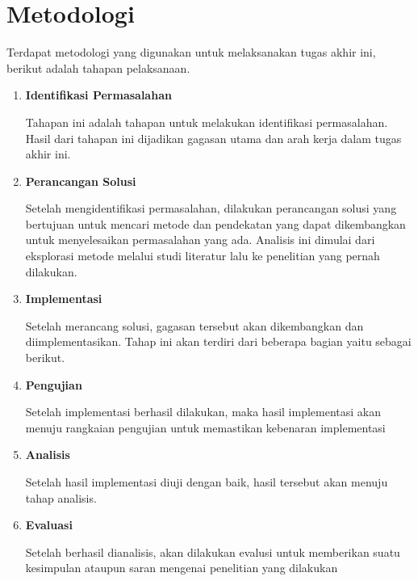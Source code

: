 \section{Metodologi}

Terdapat metodologi yang digunakan untuk melaksanakan tugas akhir ini, berikut adalah tahapan pelaksanaan.
\begin{enumerate}
    \item \textbf{Identifikasi Permasalahan}
    
    Tahapan ini adalah tahapan untuk melakukan identifikasi permasalahan. Hasil dari tahapan ini dijadikan gagasan utama dan arah kerja dalam tugas akhir ini.

    \item \textbf{Perancangan Solusi}
    
    Setelah mengidentifikasi permasalahan, dilakukan perancangan solusi yang bertujuan untuk mencari metode dan pendekatan yang dapat dikembangkan untuk menyelesaikan permasalahan yang ada. Analisis ini dimulai dari eksplorasi metode melalui studi literatur lalu ke penelitian yang pernah dilakukan.

    \item \textbf{Implementasi}
    
    Setelah merancang solusi, gagasan tersebut akan dikembangkan dan diimplementasikan. Tahap ini akan terdiri dari beberapa bagian yaitu sebagai berikut.

    \item \textbf{Pengujian}
    
    Setelah implementasi berhasil dilakukan, maka hasil implementasi akan menuju rangkaian pengujian untuk memastikan kebenaran implementasi

    \item \textbf{Analisis}
    
    Setelah hasil implementasi diuji dengan baik, hasil tersebut akan menuju tahap analisis.

    \item \textbf{Evaluasi}
    
    Setelah berhasil dianalisis, akan dilakukan evalusi untuk memberikan suatu kesimpulan ataupun saran mengenai penelitian yang dilakukan
\end{enumerate}